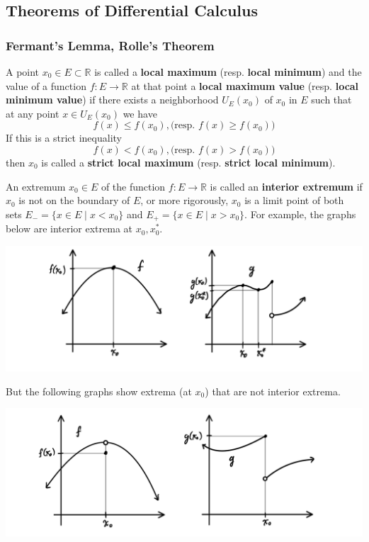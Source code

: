   \subsection{Theorems of Differential Calculus}

    \subsubsection{Fermant's Lemma, Rolle's Theorem}

    \begin{definition}
      A point $x_0 \in E \subset \mathbb{R}$ is called a \textbf{local maximum} (resp. \textbf{local minimum}) and the value of a function $f: E \longrightarrow \mathbb{R}$ at that point a \textbf{local maximum value} (resp. \textbf{local minimum value}) if there exists a neighborhood $U_E (x_0)$ of $x_0$ in $E$ such that at any point $x \in U_E (x_0)$ we have 
      \[f(x) \leq f(x_0), \big( \text{resp. } f(x) \geq f(x_0) \big)\]
      If this is a strict inequality
      \[f(x) < f(x_0), \big( \text{resp. } f(x) > f(x_0) \big)\]
      then $x_0$ is called a \textbf{strict local maximum} (resp. \textbf{strict local minimum}). 
    \end{definition}

    \begin{definition}
      An extremum $x_0 \in E$ of the function $f: E \longrightarrow \mathbb{R}$ is called an \textbf{interior extremum} if $x_0$ is not on the boundary of $E$, or more rigorously, $x_0$ is a limit point of both sets $E_- = \{x \in E \;|\; x < x_0\}$ and $E_+ = \{ x\in E\;|\; x > x_0\}$. For example, the graphs below are interior extrema at $x_0, x_0^*$. 
      \begin{center}
          \includegraphics[scale=0.25]{img/Interior_Extrema.PNG}
      \end{center}
      But the following graphs show extrema (at $x_0$) that are not interior extrema. 
      \begin{center}
          \includegraphics[scale=0.25]{img/Non_Interior_Extrema.PNG}
      \end{center}
    \end{definition}

